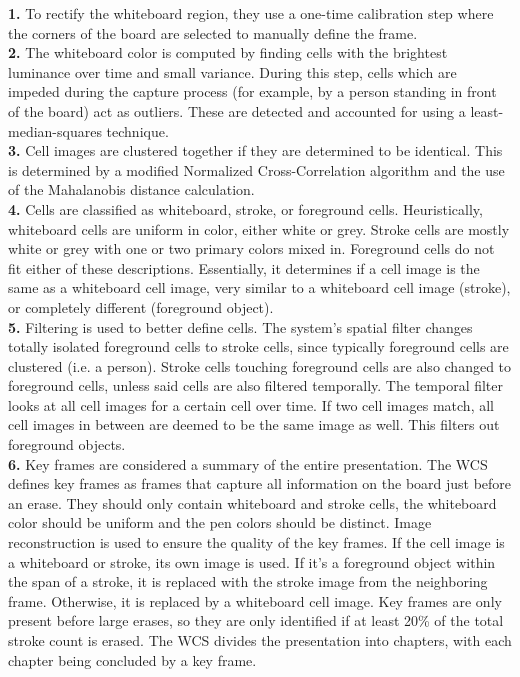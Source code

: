 \documentclass{article}
\begin{document}
	\textbf{1.} To rectify the whiteboard region, they use a one-time calibration step where the corners of the board are selected to manually define the frame.  \\
	\indent \textbf{2.} The whiteboard color is computed by finding cells with the brightest luminance over time and small variance.  During this step, cells which are impeded during the capture process (for example, by a person standing in front of the board) act as outliers.  These are detected and accounted for using a least-median-squares technique.  \\
	\indent \textbf{3.} Cell images are clustered together if they are determined to be identical.  This is determined by a modified Normalized Cross-Correlation algorithm and the use of the Mahalanobis distance calculation.  \\
	\indent \textbf{4.} Cells are classified as whiteboard, stroke, or foreground cells.  Heuristically, whiteboard cells are uniform in color, either white or grey.  Stroke cells are mostly white or grey with one or two primary colors mixed in.  Foreground cells do not fit either of these descriptions.  Essentially, it determines if a cell image is the same as a whiteboard cell image, very similar to a whiteboard cell image (stroke), or completely different (foreground object). \\
	\indent \textbf{5.} Filtering is used to better define cells.  The system's spatial filter changes totally isolated foreground cells to stroke cells, since typically foreground cells are clustered (i.e. a person).  Stroke cells touching foreground cells are also changed to foreground cells, unless said cells are also filtered temporally.  The temporal filter looks at all cell images for a certain cell over time.  If two cell images match, all cell images in between are deemed to be the same image as well.  This filters out foreground objects.  \\
	\indent \textbf{6.} Key frames are considered a summary of the entire presentation.  The WCS defines key frames as frames that capture all information on the board just before an erase.  They should only contain whiteboard and stroke cells, the whiteboard color should be uniform and the pen colors should be distinct.  Image reconstruction is used to ensure the quality of the key frames.  If the cell image is a whiteboard or stroke, its own image is used.  If it's a foreground object within the span of a stroke, it is replaced with the stroke image from the neighboring frame.  Otherwise, it is replaced by a whiteboard cell image.  Key frames are only present before large erases, so they are only identified if at least 20\% of the total stroke count is erased.  The WCS divides the presentation into chapters, with each chapter being concluded by a key frame. 
\end{document}
